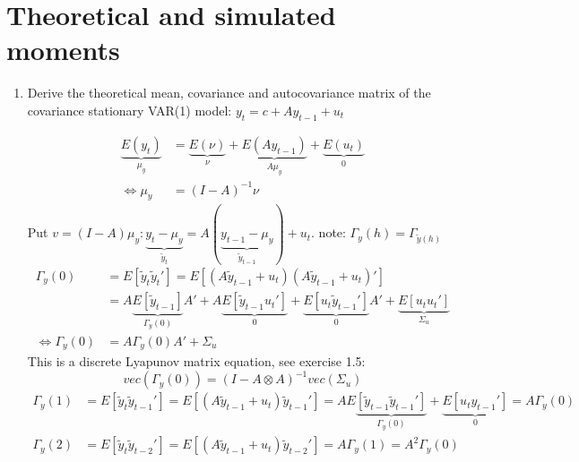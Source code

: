 \documentclass[a4paper]{scrartcl}
\begin{document}
    \section{Theoretical and simulated moments}
    \begin{enumerate}
        \item Derive the theoretical mean, covariance and autocovariance matrix of the covariance stationary VAR(1) model: $y_t = c + A y_{t-1} + u_t$
              \begin{solution}
                  \begin{align*}
                      \underbrace{E(y_t)}_{\mu_y} & = \underbrace{E(\nu)}_{\nu} + \underbrace{E(A y_{t-1})}_{A \mu_y} + \underbrace{E(u_t)}_{0} \\
                      \Leftrightarrow \mu_y       & = (I-A)^{-1} \nu
                  \end{align*}
                  Put $v = (I-A)\mu_y: \underbrace{y_t -\mu_y}_{\tilde{y}_{t}} = A(\underbrace{y_{t-1}-\mu_y}_{\tilde{y}_{t-1}}) + u_t$. note: $\Gamma_y(h) = \Gamma_{\tilde{y}(h)}$
                  \begin{align*}
                      \Gamma_y(0)                 & = E\left[\tilde{y}_t \tilde{y}_t'\right]= E\left[(A \tilde{y}_{t-1} + u_t)(A \tilde{y}_{t-1} + u_t)'\right]                                                                                                                      \\
                                                  & = A \underbrace{E\left[\tilde{y}_{t-1}\right]}_{\Gamma_y(0)} A' + A \underbrace{E\left[\tilde{y}_{t-1}u_t'\right]}_{0} + \underbrace{E\left[u_t \tilde{y}_{t-1}'\right]}_{0} A' + \underbrace{E\left[u_t u_t'\right]}_{\Sigma_u} \\
                      \Leftrightarrow \Gamma_y(0) & = A \Gamma_y(0) A' + \Sigma_u
                  \end{align*}
                  This is a discrete Lyapunov matrix equation, see exercise 1.5: $$vec(\Gamma_y(0)) = (I-A \otimes A)^{-1} vec(\Sigma_u)$$
                  \begin{align*}
                      \Gamma_y(1) & =  E\left[\tilde{y}_t \tilde{y}_{t-1}'\right]= E\left[(A \tilde{y}_{t-1} + u_t)\tilde{y}_{t-1}'\right] = A E\underbrace{\left[\tilde{y}_{t-1}\tilde{y}_{t-1}'\right]}_{\Gamma_y(0)} + \underbrace{E\left[u_t y_{t-1}'\right]}_{0} = A \Gamma_y(0) \\
                      \Gamma_y(2) & =  E\left[\tilde{y}_t \tilde{y}_{t-2}'\right]= E\left[(A \tilde{y}_{t-1} + u_t)\tilde{y}_{t-2}'\right] = A \Gamma_y(1) = A^2 \Gamma_y(0)                                                                                                          \\

\end{align*}
\end{solution}
\end{enumerate}
\end{document}
